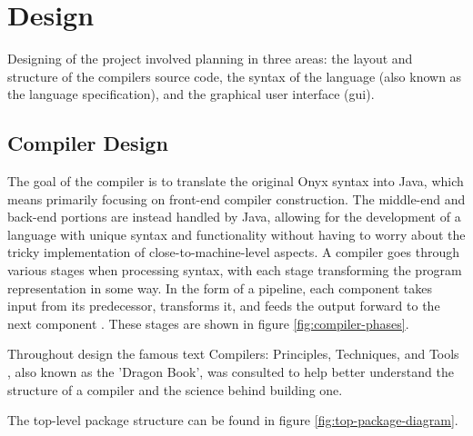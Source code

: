 \documentclass[
]{report}
\begin{document}
\chapter{Design}
Designing of the project involved planning in three areas: the layout
and structure of the compilers source code, the syntax of the language
(also known as the language specification), and the graphical user
interface (\acrshort{gui}).

\section{Compiler Design}
The goal of the compiler is to translate the original Onyx syntax into
Java, which means primarily focusing on front-end compiler construction.
The middle-end and back-end portions are instead handled by Java,
allowing for the development of a language with unique syntax and
functionality without having to worry about the tricky implementation of
close-to-machine-level aspects. A compiler goes through various stages
when processing syntax, with each stage transforming the program
representation in some way. In the form of a pipeline, each component
takes input from its predecessor, transforms it, and feeds the output
forward to the next component \cite{guru99-website}. These stages are
shown in figure \ref{fig:compiler-phases}.

Throughout design the famous text Compilers: Principles, Techniques, and Tools \cite{dragon-book},
also known as the 'Dragon Book', was consulted to help better understand 
the structure of a compiler and the science behind building one.

The top-level package structure can be found in figure \ref{fig:top-package-diagram}.
\end{document}

